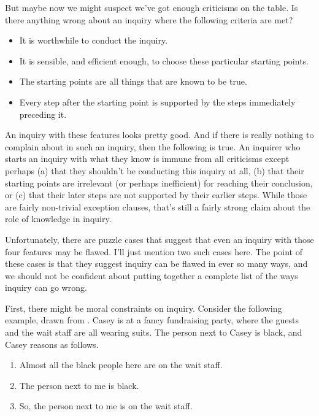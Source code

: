 \documentclass[11pt,]{book}
\providecommand{\tightlist}{%
  \setlength{\itemsep}{0pt}\setlength{\parskip}{0pt}}
\begin{document}
But maybe now we might suspect we've got enough criticisms on the table. Is there anything wrong about an inquiry where the following criteria are met?

\begin{itemize}
\tightlist
\item
  It is worthwhile to conduct the inquiry.
\item
  It is sensible, and efficient enough, to choose these particular starting points.
\item
  The starting points are all things that are known to be true.
\item
  Every step after the starting point is supported by the steps immediately preceding it.
\end{itemize}

An inquiry with these features looks pretty good. And if there is really nothing to complain about in such an inquiry, then the following is true. An inquirer who starts an inquiry with what they know is immune from all criticisms except perhaps (a) that they shouldn't be conducting this inquiry at all, (b) that their starting points are irrelevant (or perhaps inefficient) for reaching their conclusion, or (c) that their later steps are not supported by their earlier steps. While those are fairly non-trivial exception clauses, that's still a fairly strong claim about the role of knowledge in inquiry.

Unfortunately, there are puzzle cases that suggest that even an inquiry with those four features may be flawed. I'll just mention two such cases here. The point of these cases is that they suggest inquiry can be flawed in ever so many ways, and we should not be confident about putting together a complete list of the ways inquiry can go wrong.

First, there might be moral constraints on inquiry. Consider the following example, drawn from \citet{BasuSchroeder2019}. Casey is at a fancy fundraising party, where the guests and the wait staff are all wearing suits. The person next to Casey is black, and Casey reasons as follows.

\begin{enumerate}
\def\labelenumi{\arabic{enumi}.}
\tightlist
\item
  Almost all the black people here are on the wait staff.
\item
  The person next to me is black.
\item
  So, the person next to me is on the wait staff.
\end{enumerate}
\end{document}
